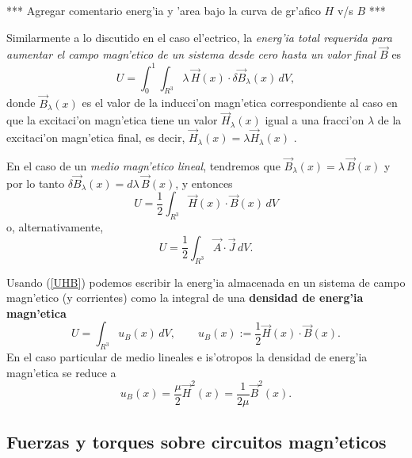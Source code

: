 *** Agregar comentario energ'ia y 'area bajo la curva de gr'afico $H$ v/s $B$ ***

Similarmente a lo discutido en el caso el'ectrico, la \textit{energ'ia total requerida para aumentar el campo magn'etico de un sistema desde cero hasta un valor final $\vec{B}$} es 
\begin{equation}
 U=\int_0^1\int_{R^3} \lambda \, \vec{H}(x)\cdot \delta\vec{B}_\lambda(x)\,dV,
\end{equation}
donde $\vec{B}_\lambda(x)$ es el valor de la inducci'on magn'etica correspondiente al caso en que la excitaci'on magn'etica tiene un valor $\vec{H}_\lambda(x)$ igual a una fracci'on $\lambda$ de la excitaci'on magn'etica final, es decir, $\vec{H}_\lambda (x)=\lambda\vec{H}_\lambda (x)$ .

En el caso de un \textit{medio magn'etico lineal}, tendremos que $\vec{B}_\lambda (x)=\lambda\, \vec{B}(x)$ y por lo tanto $\delta\vec{B}_\lambda (x)=d\lambda\,
\vec{B}(x)$, y entonces
\begin{equation}\label{UHB}
 \boxed{U=\frac{1}{2}\int_{R^3} \vec{H}(x)\cdot\vec{B}(x)\,dV }
\end{equation}
o, alternativamente, 
\begin{equation}
 \boxed{U=\frac{1}{2}\int_{R^3} \vec{A}\cdot \vec{J}\,dV.}
\end{equation}

Usando (\ref{UHB}) podemos escribir la energ'ia almacenada en un sistema de campo magn'etico (y corrientes) como la integral de una \textbf{densidad de energ'ia magn'etica}
\begin{equation}
 \boxed{U=\int_{R^3} u_B(x)\,dV, \qquad u_B(x):=\frac{1}{2}\vec{H}(x)\cdot\vec{B}(x).}
\end{equation}
En el caso particular de medio lineales e is'otropos la densidad de energ'ia magn'etica se reduce a
\begin{equation}
 u_B(x)=\frac{\mu}{2}\vec{H}^2(x)=\frac{1}{2\mu}\vec{B}^2(x).
\end{equation}


\subsection{Fuerzas y torques sobre circuitos magn'eticos}
%

